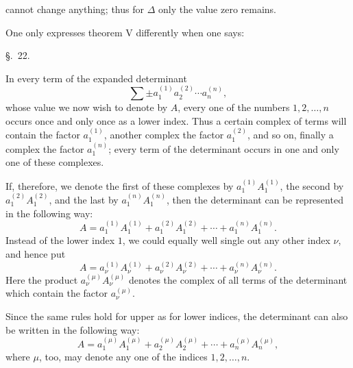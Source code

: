 
cannot change anything; thus for \(\Delta\) only the value zero remains.

One only expresses theorem V differently when one says:


\begin{center}
{\large \S.\ 22.}

\vspace{0.5em}
{\large{}}
\end{center}

In every term of the expanded determinant
\[
 \sum \pm a_1^{(1)}a_2^{(2)}\cdots a_n^{(n)},
\]
whose value we now wish to denote by \(A\), every one of the numbers \(1,2,\ldots,n\) occurs once and only once as a lower index. Thus a certain complex of terms will contain the factor \(a_1^{(1)}\), another complex the factor \(a_1^{(2)}\), and so on, finally a complex the factor \(a_1^{(n)}\); every term of the determinant occurs in one and only one of these complexes.

If, therefore, we denote the first of these complexes by \(a_1^{(1)}A_1^{(1)}\), the second by \(a_1^{(2)}A_1^{(2)}\), and the last by \(a_1^{(n)}A_1^{(n)}\), then the determinant can be represented in the following way:
\begin{equation}
 A=a_1^{(1)}A_1^{(1)}+a_1^{(2)}A_1^{(2)}+\cdots+a_1^{(n)}A_1^{(n)}.
\tag{1}
\end{equation}
Instead of the lower index \(1\), we could equally well single out any other index \(\nu\), and hence put
\begin{equation}
 A=a_\nu^{(1)}A_\nu^{(1)}+a_\nu^{(2)}A_\nu^{(2)}+\cdots+a_\nu^{(n)}A_\nu^{(n)}.
\tag{2}
\end{equation}
Here the product \(a_\nu^{(\mu)}A_\nu^{(\mu)}\) denotes the complex of all terms of the determinant which contain the factor \(a_\nu^{(\mu)}\).

Since the same rules hold for upper as for lower indices, the determinant can also be written in the following way:
\begin{equation}
 A=a_1^{(\mu)}A_1^{(\mu)}+a_2^{(\mu)}A_2^{(\mu)}
 +\cdots+a_n^{(\mu)}A_n^{(\mu)},
\tag{3}
\end{equation}
where \(\mu\), too, may denote any one of the indices \(1,2,\ldots,n\).
